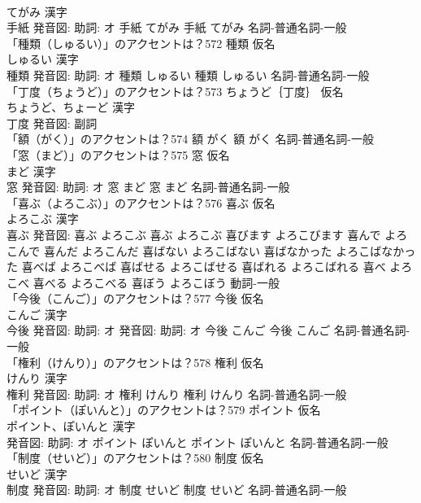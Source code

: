 \documentclass[8pt]{extreport}
\begin{document}
\begin{CJK}{UTF8}{min}
\\	てがみ 漢字　
\\	手紙 発音図: 助詞: オ	手紙 てがみ		手紙 てがみ				名詞-普通名詞-一般 
\\	「種類（しゅるい）」のアクセントは？572	種類 仮名　
\\	しゅるい 漢字　
\\	種類 発音図: 助詞: オ	種類 しゅるい		種類 しゅるい				名詞-普通名詞-一般 
\\	「丁度（ちょうど）」のアクセントは？573	ちょうど｛丁度｝ 仮名　
\\	ちょうど、ちょーど 漢字　
\\	丁度 発音図:							副詞 
\\	「額（がく）」のアクセントは？574		額 がく		額 がく				名詞-普通名詞-一般 
\\	「窓（まど）」のアクセントは？575	窓 仮名　
\\	まど 漢字　
\\	窓 発音図: 助詞: オ	窓 まど		窓 まど				名詞-普通名詞-一般 
\\	「喜ぶ（よろこぶ）」のアクセントは？576	喜ぶ 仮名　
\\	よろこぶ 漢字　
\\	喜ぶ 発音図:	喜ぶ よろこぶ		喜ぶ よろこぶ 喜びます よろこびます 喜んで よろこんで 喜んだ よろこんだ 喜ばない よろこばない 喜ばなかった よろこばなかった 喜べば よろこべば 喜ばせる よろこばせる 喜ばれる よろこばれる 喜べ よろこべ 喜べる よろこべる 喜ぼう よろこぼう				動詞-一般 
\\	「今後（こんご）」のアクセントは？577	今後 仮名　
\\	こんご 漢字　
\\	今後 発音図: 助詞: オ 発音図: 助詞: オ	今後 こんご		今後 こんご				名詞-普通名詞-一般 
\\	「権利（けんり）」のアクセントは？578	権利 仮名　
\\	けんり 漢字　
\\	権利 発音図: 助詞: オ	権利 けんり		権利 けんり				名詞-普通名詞-一般 
\\	「ポイント（ぽいんと）」のアクセントは？579	ポイント 仮名　
\\	ポイント、ぽいんと 漢字　
\\	発音図: 助詞: オ	ポイント ぽいんと		ポイント ぽいんと				名詞-普通名詞-一般 
\\	「制度（せいど）」のアクセントは？580	制度 仮名　
\\	せいど 漢字　
\\	制度 発音図: 助詞: オ	制度 せいど		制度 せいど				名詞-普通名詞-一般 

\end{CJK}
\end{document}

